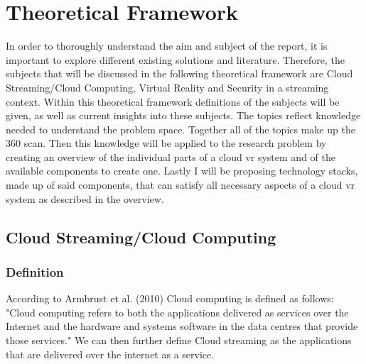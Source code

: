 
\section{Theoretical Framework}

In order to thoroughly understand the aim and subject of the report, it is important to explore different existing solutions and literature. Therefore, the subjects that will be discussed in the following theoretical framework are Cloud Streaming/Cloud Computing, Virtual Reality and Security in a streaming context. Within this theoretical framework definitions of the subjects will be given, as well as current insights into these subjects. The topics reflect knowledge needed to understand the problem space. Together all of the topics make up the 360 scan. Then this knowledge will be applied to the research problem by creating an overview of the individual parts of a cloud \acrshort{vr} system and of the available components to create one.  Lastly I will be proposing technology stacks, made up of said components, that can satisfy all necessary aspects of a cloud \acrshort{vr} system as described in the overview.

\subsection{Cloud Streaming/Cloud Computing}

\subsubsection{Definition}
According to Armbrust et al. (2010) Cloud computing is defined as follows: 
"Cloud computing refers to both the applications delivered as services over the Internet and the hardware and systems software in the data centres that provide those services." \parencite{aviewoncc}
We can then further define Cloud streaming as the applications that are delivered over the internet as a service.

